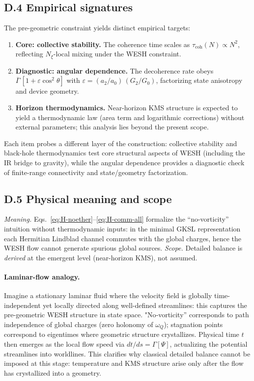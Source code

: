 \documentclass[12pt,a4paper]{article}
\numberwithin{equation}{section}
\begin{document}
\subsection*{D.4 Empirical signatures}
\vspace{0.3cm}
The pre-geometric constraint yields distinct empirical targets:
\begin{enumerate}[leftmargin=1.2em,itemsep=0.25em]
\item \textbf{Core: collective stability.} The coherence time scales as $\tau_{\mathrm{coh}}(N)\propto N^2$, reflecting $N_\xi$-local mixing under the WESH constraint.
\item \textbf{Diagnostic: angular dependence.} The decoherence rate obeys $\overline\Gamma\,[1+\varepsilon\cos^2\theta]$ with $\varepsilon=(a_2/a_0)\,(G_2/G_0)$, factorizing state anisotropy and device geometry.
\item \textbf{Horizon thermodynamics.} Near-horizon KMS structure is expected to yield a thermodynamic law (area term and logarithmic corrections) without external parameters; this analysis lies beyond the present scope.
\end{enumerate}
Each item probes a different layer of the construction: collective stability and black-hole thermodynamics test core structural aspects of WESH (including the IR bridge to gravity), while the angular dependence provides a diagnostic check of finite-range connectivity and state/geometry factorization.
\vspace{0.3cm}
\subsection*{D.5 Physical meaning and scope}
\vspace{0.3cm}
\emph{Meaning.} Eqs.~\eqref{eq:H-noether}–\eqref{eq:H-comm-all} formalize the “no-vorticity” intuition without thermodynamic inputs: in the minimal GKSL representation each Hermitian Lindblad channel commutes with the global charges, hence the WESH flow cannot generate spurious global sources.  
\emph{Scope.} Detailed balance is \emph{derived} at the emergent level (near-horizon KMS), not assumed.

\paragraph{Laminar-flow analogy.}
Imagine a stationary laminar fluid where the velocity field is globally time-independent yet locally directed along well-defined streamlines: this captures the pre-geometric WESH structure in state space. "No‑vorticity'' corresponds to path independence of global charges (zero holonomy of $\omega_Q$); stagnation points correspond to eigentimes where geometric structure crystallizes. Physical time $t$ then emerges as the local flow speed via $dt/ds=\Gamma[\Psi]$, actualizing the potential streamlines into worldlines. This clarifies why classical detailed balance cannot be imposed at this stage: temperature and KMS structure arise only after the flow has crystallized into a geometry.
\end{document}
